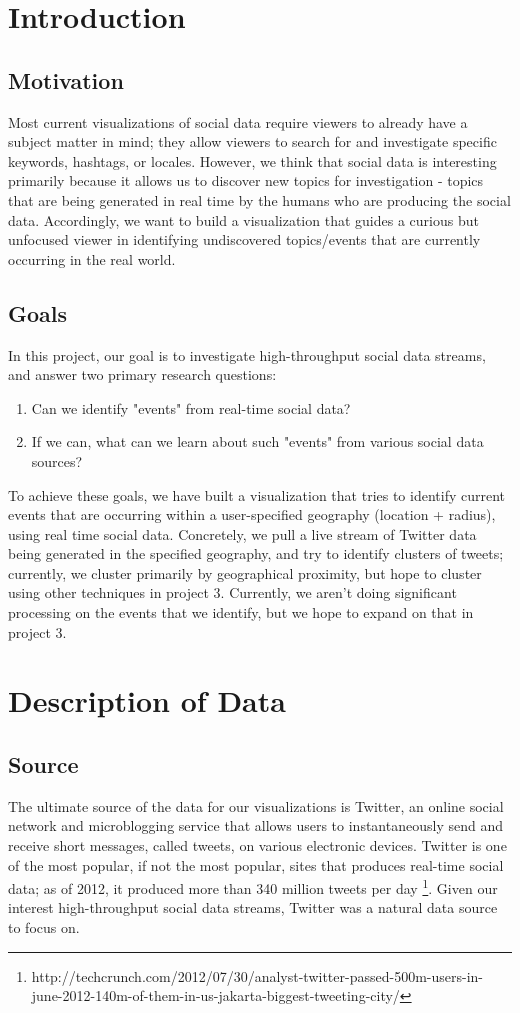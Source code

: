 \documentclass[pdftex,12pt,a4paper]{article}
\begin{document}

\tableofcontents
\pagebreak

\section{Introduction}
\subsection{Motivation}
Most current visualizations of social data require viewers to already have a subject matter in mind; they allow viewers to search for and investigate specific keywords, hashtags, or locales. However, we think that social data is interesting primarily because it allows us to discover new topics for investigation - topics that are being generated in real time by the humans who are producing the social data. Accordingly, we want to build a visualization that guides a curious but unfocused viewer in identifying undiscovered topics/events that are currently occurring in the real world.
\subsection{Goals}
In this project, our goal is to investigate high-throughput social data streams, and answer two primary research questions:
\begin{enumerate}
\item Can we identify "events" from real-time social data?
\item If we can, what can we learn about such "events" from various social data sources?
\end{enumerate}
To achieve these goals, we have built a visualization that tries to identify current events that are occurring within a user-specified geography (location + radius), using real time social data. Concretely, we pull a live stream of Twitter data being generated in the specified geography, and try to identify clusters of tweets; currently, we cluster primarily by geographical proximity, but hope to cluster using other techniques in project 3. Currently, we aren't doing significant processing on the events that we identify, but we hope to expand on that in project 3.

\section{Description of Data}
\subsection{Source}
The ultimate source of the data for our visualizations is Twitter, an online social network and microblogging service that allows users to instantaneously send and receive short messages, called tweets, on various electronic devices. Twitter is one of the most popular, if not the most popular, sites that produces real-time social data; as of 2012, it produced more than 340 million tweets per day \footnote{http://techcrunch.com/2012/07/30/analyst-twitter-passed-500m-users-in-june-2012-140m-of-them-in-us-jakarta-biggest-tweeting-city/}. Given our interest high-throughput social data streams, Twitter was a natural data source to focus on.
\end{document}
